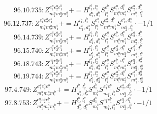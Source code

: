 \documentclass[letterpaper,10pt,fleqn,leqno,onecolumn]{article}
\begin{document}
\begin{equation} \;\;\;\;\;\;  96.10.735: Z^{e_{1}^{a}e_{2}^{a}e_{1}^{b}}_{m_{1}^{a}m_{2}^{a}m_{1}^{b}}+=H^{l_{1}^{b},l_{1}^{a}}_{d_{1}^{a},d_{1}^{b}}S^{e_{1}^{b}}_{l_{1}^{b}}S^{e_{1}^{a},d_{1}^{a}}_{m_{1}^{a}m_{2}^{a}}S^{e_{2}^{a},d_{1}^{b}}_{m_{1}^{b},l_{1}^{a}} \end{equation}
\begin{equation} \;\;\;\;\;\;  96.12.737: Z^{e_{1}^{a}e_{2}^{a}e_{1}^{b}}_{m_{1}^{a}m_{2}^{a}m_{1}^{b}}+=H^{l_{1}^{a},l_{1}^{b}}_{d_{1}^{b},d_{1}^{a}}S^{e_{1}^{a}}_{l_{1}^{a}}S^{e_{2}^{a},d_{1}^{b}}_{m_{1}^{a}m_{1}^{b}}S^{e_{1}^{b},d_{1}^{a}}_{m_{2}^{a},l_{1}^{b}}\cdot -1/1 \end{equation}
\begin{equation} \;\;\;\;\;\;  96.14.739: Z^{e_{1}^{a}e_{2}^{a}e_{1}^{b}}_{m_{1}^{a}m_{2}^{a}m_{1}^{b}}+=H^{l_{1}^{a},l_{1}^{b}}_{d_{1}^{a},d_{1}^{b}}S^{e_{1}^{a}}_{l_{1}^{a}}S^{e_{1}^{b},d_{1}^{a}}_{m_{1}^{a}m_{1}^{b}}S^{e_{2}^{a},d_{1}^{b}}_{m_{2}^{a},l_{1}^{b}} \end{equation}
\begin{equation} \;\;\;\;\;\;  96.15.740: Z^{e_{1}^{a}e_{2}^{a}e_{1}^{b}}_{m_{1}^{a}m_{2}^{a}m_{1}^{b}}+=H^{l_{1}^{a},l_{1}^{b}}_{d_{1}^{a},d_{1}^{b}}S^{e_{1}^{a}}_{l_{1}^{a}}S^{e_{2}^{a},d_{1}^{a}}_{m_{1}^{a}m_{2}^{a}}S^{e_{1}^{b},d_{1}^{b}}_{m_{1}^{b},l_{1}^{b}} \end{equation}
\begin{equation} \;\;\;\;\;\;  96.18.743: Z^{e_{1}^{a}e_{2}^{a}e_{1}^{b}}_{m_{1}^{a}m_{2}^{a}m_{1}^{b}}+=H^{l_{1}^{a},l_{2}^{a}}_{d_{1}^{a},d_{2}^{a}}S^{e_{1}^{a}}_{l_{1}^{a}}S^{e_{1}^{b},d_{1}^{a}}_{m_{1}^{a}m_{1}^{b}}S^{e_{2}^{a},d_{2}^{a}}_{m_{2}^{a},l_{2}^{a}} \end{equation}
\begin{equation} \;\;\;\;\;\;  96.19.744: Z^{e_{1}^{a}e_{2}^{a}e_{1}^{b}}_{m_{1}^{a}m_{2}^{a}m_{1}^{b}}+=H^{l_{1}^{a},l_{2}^{a}}_{d_{1}^{a},d_{2}^{a}}S^{e_{1}^{a}}_{l_{1}^{a}}S^{e_{2}^{a},d_{1}^{a}}_{m_{1}^{a}m_{2}^{a}}S^{e_{1}^{b},d_{2}^{a}}_{m_{1}^{b},l_{2}^{a}} \end{equation}
\begin{equation} \;\;\;\;\;\;  97.4.749: Z^{e_{1}^{a}e_{2}^{a}e_{1}^{b}}_{m_{1}^{a}m_{2}^{a}m_{1}^{b}}+=H^{l_{1}^{b},l_{2}^{b}}_{d_{1}^{b},d_{2}^{b}}S^{d_{1}^{b}}_{m_{1}^{b}}S^{e_{1}^{a}e_{1}^{b}}_{m_{1}^{a},l_{1}^{b}}S^{e_{2}^{a},d_{2}^{b}}_{m_{2}^{a},l_{2}^{b}}\cdot -1/1 \end{equation}
\begin{equation} \;\;\;\;\;\;  97.8.753: Z^{e_{1}^{a}e_{2}^{a}e_{1}^{b}}_{m_{1}^{a}m_{2}^{a}m_{1}^{b}}+=H^{l_{1}^{b},l_{1}^{a}}_{d_{1}^{b},d_{1}^{a}}S^{d_{1}^{b}}_{m_{1}^{b}}S^{e_{1}^{a}e_{1}^{b}}_{m_{1}^{a},l_{1}^{b}}S^{e_{2}^{a},d_{1}^{a}}_{m_{2}^{a},l_{1}^{a}}\cdot -1/1 \end{equation}
\end{document}
